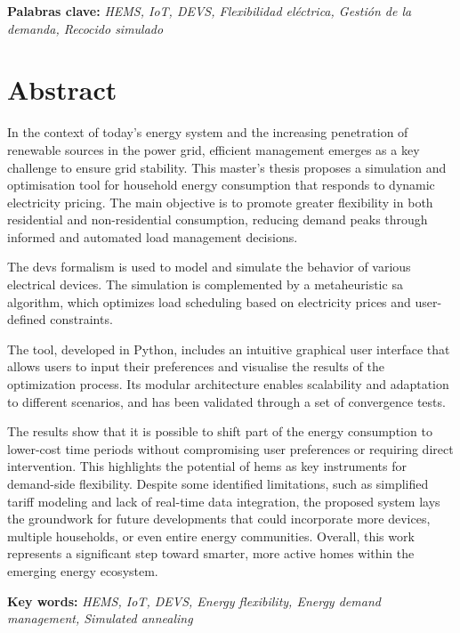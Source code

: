 \documentclass[11pt,a4paper]{book}
\begin{document}
\noindent\textbf{Palabras clave: }\textit{HEMS, IoT, DEVS, Flexibilidad eléctrica, Gestión de la demanda, Recocido simulado}

\chapter*{Abstract}
In the context of today’s energy system and the increasing penetration of renewable sources in the power grid, efficient management emerges as a key challenge to ensure grid stability. This master's thesis proposes a simulation and optimisation tool for household energy consumption that responds to dynamic electricity pricing. The main objective is to promote greater flexibility in both residential and non-residential consumption, reducing demand peaks through informed and automated load management decisions.

The \gls{devs} formalism is used to model and simulate the behavior of various electrical devices. The simulation is complemented by a metaheuristic \gls{sa} algorithm, which optimizes load scheduling based on electricity prices and user-defined constraints.

The tool, developed in Python, includes an intuitive graphical user interface that allows users to input their preferences and visualise the results of the optimization process. Its modular architecture enables scalability and adaptation to different scenarios, and has been validated through a set of convergence tests.

The results show that it is possible to shift part of the energy consumption to lower-cost time periods without compromising user preferences or requiring direct intervention. This highlights the potential of \gls{hems} as key instruments for demand-side flexibility. Despite some identified limitations, such as simplified tariff modeling and lack of real-time data integration, the proposed system lays the groundwork for future developments that could incorporate more devices, multiple households, or even entire energy communities. Overall, this work represents a significant step toward smarter, more active homes within the emerging energy ecosystem.

\vspace{1cm}

\noindent\textbf{Key words: }\textit{HEMS, IoT, DEVS, Energy flexibility, Energy demand management, Simulated annealing}

\printglossaries
\tableofcontents 
\listoftables
\listoffigures
\lstlistoflistings
\end{document}
